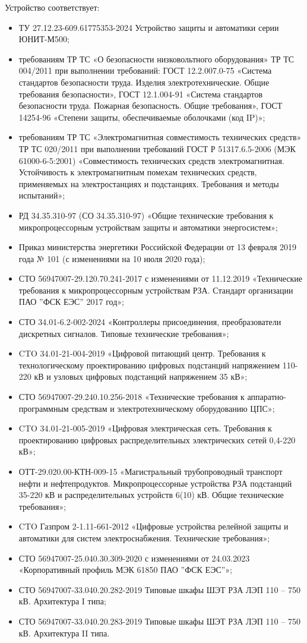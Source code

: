 Устройство соответствует:
\begin{itemize}
\item ТУ 27.12.23-609.61775353-2024 Устройство защиты и автоматики серии ЮНИТ-М500;
\item требованиям ТР ТС «О безопасности низковольтного оборудования» ТР ТС 004/2011 при выполнении требований: ГОСТ 12.2.007.0-75 «Система стандартов безопасности труда. Изделия электротехнические. Общие требования безопасности», ГОСТ 12.1.004-91 «Система стандартов безопасности труда. Пожарная безопасность. Общие требования», ГОСТ 14254-96 «Степени защиты, обеспечиваемые оболочками (код IP)»; 
\item требованиям ТР ТС «Электромагнитная совместимость технических средств» ТР ТС 020/2011 при выполнении требований ГОСТ Р 51317.6.5-2006 (МЭК 61000-6-5:2001) «Совместимость технических средств электромагнитная. Устойчивость к электромагнитным помехам технических средств, применяемых на электростанциях и подстанциях. Требования и методы испытаний»;
\item РД 34.35.310-97 (СО 34.35.310-97) «Общие технические требования к микропроцессорным устройствам защиты и автоматики энергосистем»;
\item Приказ министерства энергетики Российской Федерации от 13 февраля 2019 года № 101 (с изменениями на 10 июля 2020 года);
\item СТО 56947007-29.120.70.241-2017 с изменениями от 11.12.2019 «Технические требования к микропроцессорным устройствам РЗА. Стандарт организации ПАО ''ФСК ЕЭС'' 2017 год»;
\item СТО 34.01-6.2-002-2024 «Контроллеры присоединения, преобразователи дискретных сигналов. Типовые технические требования»;
\item CTO 34.01-21-004-2019 «Цифровой питающий центр. Требования к технологическому проектированию цифровых подстанций напряжением 110-220 кВ и узловых цифровых подстанций напряжением 35 кВ»;
\item СТО 56947007-29.240.10.256-2018 «Технические требования к аппаратно-программным средствам и электротехническому оборудованию ЦПС»;
\item CTO 34.01-21-005-2019 «Цифровая электрическая сеть. Требования к проектированию цифровых распределительных электрических сетей 0,4-220 кВ»;
\item \sloppy ОТТ-29.020.00-КТН-009-15 «Магистральный трубопроводный транспорт нефти и нефтепродуктов. Микропроцессорные устройства РЗА подстанций 35-220 кВ и распределительных устройств 6(10) кВ. Общие технические требования»;
\item CTO Газпром 2-1.11-661-2012 «Цифровые устройства релейной защиты и автоматики для систем электроснабжения. Технические требования»;
\item СТО 56947007-25.040.30.309-2020 с изменениями от 24.03.2023 «Корпоративный профиль МЭК 61850 ПАО ''ФСК ЕЭС''»;
\item СТО 56947007-33.040.20.282-2019 Типовые шкафы ШЭТ РЗА ЛЭП 110 – 750 кВ. Архитектура I типа;
\item СТО 56947007-33.040.20.283-2019 Типовые шкафы ШЭТ РЗА ЛЭП 110 – 750 кВ. Архитектура II типа.
\end{itemize}

